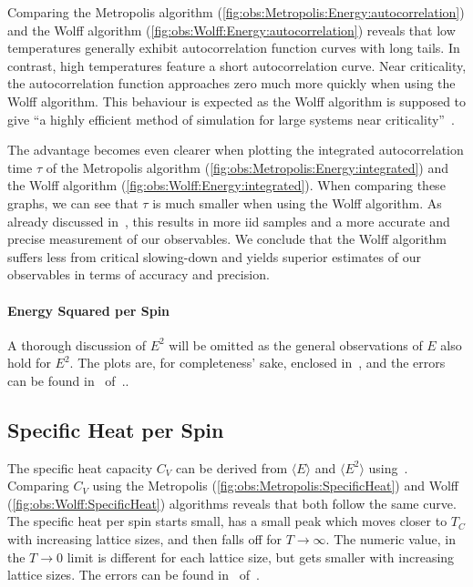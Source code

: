 		Comparing the Metropolis algorithm (\cref{fig:obs:Metropolis:Energy:autocorrelation}) and the Wolff algorithm (\cref{fig:obs:Wolff:Energy:autocorrelation}) reveals that low temperatures generally exhibit autocorrelation function curves with long tails. In contrast, high temperatures feature a short autocorrelation curve. Near criticality, the autocorrelation function approaches zero much more quickly when using the Wolff algorithm. This behaviour is expected as the Wolff algorithm is supposed to give \enquote{a highly efficient method of simulation for large systems near criticality}~\cite[p. 86]{sw}.
		
		The advantage becomes even clearer when plotting the integrated autocorrelation time $\tau$ of the Metropolis algorithm (\cref{fig:obs:Metropolis:Energy:integrated}) and the Wolff algorithm (\cref{fig:obs:Wolff:Energy:integrated}). When comparing these graphs, we can see that $\tau$ is much smaller when using the Wolff algorithm. As already discussed in~, this results in more iid samples and a more accurate and precise measurement of our observables. We conclude that the Wolff algorithm suffers less from critical slowing-down and yields superior estimates of our observables in terms of accuracy and precision.
	
	\paragraph{Energy Squared per Spin}\label{sec:res:energysquare} A thorough discussion of $E^2$ will be omitted as the general observations of $E$ also hold for $E^2$. The plots are, for completeness' sake, enclosed in~, and the errors can be found in~ of~..
	
	\subsection{Specific Heat per Spin}\label{sec:res:cv:observable}
		The specific heat capacity $C_V$ can be derived from $\langle E \rangle$ and $\langle E^2 \rangle$  using~. Comparing $C_V$ using the Metropolis (\cref{fig:obs:Metropolis:SpecificHeat}) and Wolff (\cref{fig:obs:Wolff:SpecificHeat}) algorithms reveals that both follow the same curve. The specific heat per spin starts small, has a small peak which moves closer to $T_C$ with increasing lattice sizes, and then falls off for $T\rightarrow \infty$. The numeric value, in the $T\rightarrow 0$ limit is different for each lattice size, but gets smaller with increasing lattice sizes. The errors can be found in~ of~.
		
